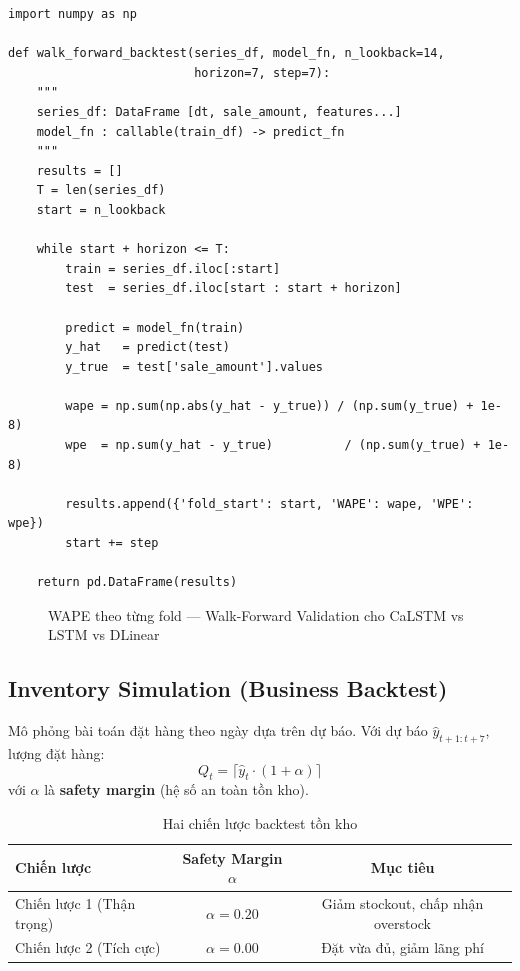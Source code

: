 \documentclass[12pt,a4paper]{report}
\begin{document}
\begin{lstlisting}[caption=Walk-Forward Validation]
import numpy as np

def walk_forward_backtest(series_df, model_fn, n_lookback=14,
                          horizon=7, step=7):
    """
    series_df: DataFrame [dt, sale_amount, features...]
    model_fn : callable(train_df) -> predict_fn
    """
    results = []
    T = len(series_df)
    start = n_lookback

    while start + horizon <= T:
        train = series_df.iloc[:start]
        test  = series_df.iloc[start : start + horizon]

        predict = model_fn(train)
        y_hat   = predict(test)
        y_true  = test['sale_amount'].values

        wape = np.sum(np.abs(y_hat - y_true)) / (np.sum(y_true) + 1e-8)
        wpe  = np.sum(y_hat - y_true)          / (np.sum(y_true) + 1e-8)

        results.append({'fold_start': start, 'WAPE': wape, 'WPE': wpe})
        start += step

    return pd.DataFrame(results)
\end{lstlisting}

\begin{figure}[H]
    \centering
    \caption{WAPE theo từng fold --- Walk-Forward Validation cho CaLSTM vs LSTM vs DLinear}
\end{figure}

\subsection{Inventory Simulation (Business Backtest)}

Mô phỏng bài toán đặt hàng theo ngày dựa trên dự báo. Với dự báo $\hat{y}_{t+1:t+7}$, lượng đặt hàng:
\[
Q_t = \lceil \hat{y}_t \cdot (1 + \alpha) \rceil
\]
với $\alpha$ là \textbf{safety margin} (hệ số an toàn tồn kho).

\begin{table}[H]
\centering
\caption{Hai chiến lược backtest tồn kho}
\begin{tabular}{lcc}
\toprule
\textbf{Chiến lược} & \textbf{Safety Margin $\alpha$} & \textbf{Mục tiêu} \\
\midrule
Chiến lược 1 (Thận trọng) & $\alpha = 0.20$ & Giảm stockout, chấp nhận overstock \\
Chiến lược 2 (Tích cực)   & $\alpha = 0.00$ & Đặt vừa đủ, giảm lãng phí \\
\bottomrule
\end{tabular}
\end{table}
\end{document}
